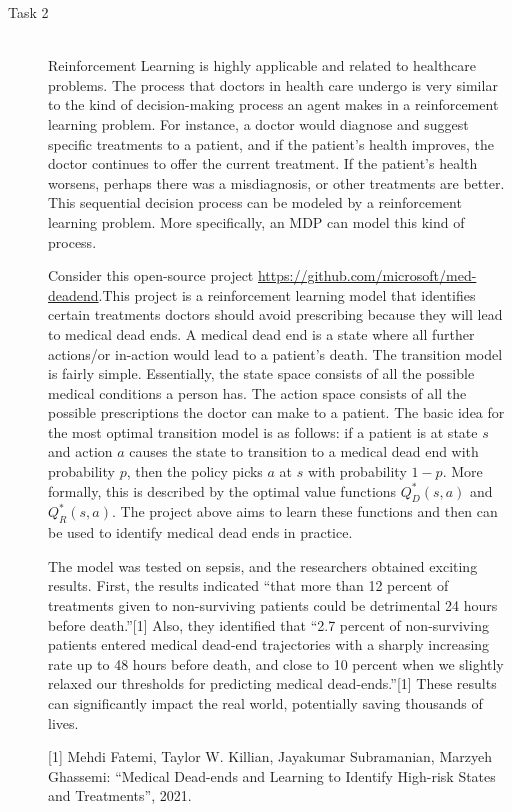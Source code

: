 \documentclass[12pt]{article}
\begin{document}
\begin{description}
    \item[Task 2] \hfill \\
    Reinforcement Learning is highly applicable and related to healthcare
    problems. The process that doctors in health care undergo is very similar
    to the kind of decision-making process an agent makes in a reinforcement
    learning problem. For instance, a doctor would diagnose and suggest
    specific treatments to a patient, and if the patient's health improves, the
    doctor continues to offer the current treatment. If the patient's health
    worsens, perhaps there was a misdiagnosis, or other treatments are better.
    This sequential decision process can be modeled by a reinforcement learning
    problem. More specifically, an MDP can model this kind of process.

    Consider this open-source project
    \url{https://github.com/microsoft/med-deadend}.This project is a
    reinforcement learning model that identifies certain treatments doctors
    should avoid prescribing because they will lead to medical dead ends. A
    medical dead end is a state where all further actions/or in-action would
    lead to a patient's death. The transition model is fairly simple.
    Essentially, the state space consists of all the possible medical
    conditions a person has. The action space consists of all the possible
    prescriptions the doctor can make to a patient. The basic idea for the most
    optimal transition model is as follows: if a patient is at state $s$ and
    action $a$ causes the state to transition to a medical dead end with
    probability $p$, then the policy picks $a$ at $s$ with probability $1-p$.
    More formally, this is described by the optimal value functions $Q_D^*(s,
    a)$ and $Q_R^*(s, a)$. The project above aims to learn these functions and
    then can be used to identify medical dead ends in practice.

    The model was tested on sepsis, and the researchers obtained exciting
    results. First, the results indicated ``that more than 12 percent of
    treatments given to non-surviving patients could be detrimental 24 hours
    before death.''[1] Also, they identified that ``2.7 percent of
    non-surviving patients entered medical dead-end trajectories with a sharply
    increasing rate up to 48 hours before death, and close to 10 percent when
    we slightly relaxed our thresholds for predicting medical dead-ends.''[1]
    These results can significantly impact the real world, potentially saving
    thousands of lives.

    [1] Mehdi Fatemi, Taylor W. Killian, Jayakumar Subramanian, Marzyeh
    Ghassemi: “Medical Dead-ends and Learning to Identify High-risk States and
    Treatments”, 2021.
\end{description}
\end{document}
